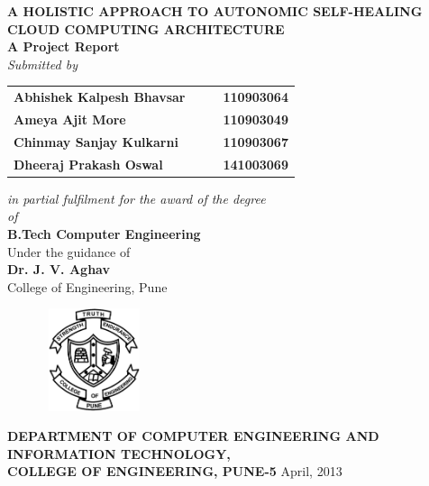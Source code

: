 \begin{titlepage}
\begin{center}
\LARGE{\bf{A HOLISTIC APPROACH TO AUTONOMIC SELF-HEALING CLOUD COMPUTING ARCHITECTURE\\}}	%
\vspace{10pt}
\Large{\bf{A Project Report\\}}		%
\Large{\em{Submitted by\\}}
\begin{table}[htbp]
	\begin{center}
	\begin{tabular}{ l c c l }
	\Large\bf{Abhishek Kalpesh Bhavsar} & & & \Large\bf{110903064} \\[0.3cm] 
	\Large\bf{Ameya Ajit More} & & & \Large\bf{110903049} \\[0.3cm] 
	\Large\bf{Chinmay Sanjay Kulkarni} & & & \Large\bf{110903067} \\[0.3cm] 
	\Large\bf{Dheeraj Prakash Oswal} & & & \Large\bf{141003069} \\
	\end{tabular}
	\end{center}
	\end{table}
\Large{\em{in partial fulfilment for the award of the degree\\ \vspace{1.5pt}of\\}}
\LARGE{\bf{B.Tech Computer Engineering\\}}%
\vspace{20pt}
\Large{Under the guidance of\\ }
\Large{\bf{Dr. J. V. Aghav}\\}
\Large{College of Engineering, Pune\\}
\vspace{10pt}
\begin{figure}[h]
\centering
\includegraphics[width=3cm,height=3cm]{figures/coeplogo.eps}
\end{figure}
\Large{\bf{DEPARTMENT OF COMPUTER ENGINEERING AND \\INFORMATION TECHNOLOGY,\\ 
COLLEGE OF ENGINEERING, PUNE-5}}
\vfill
\large{April, 2013}
\end{center}
\end{titlepage}
